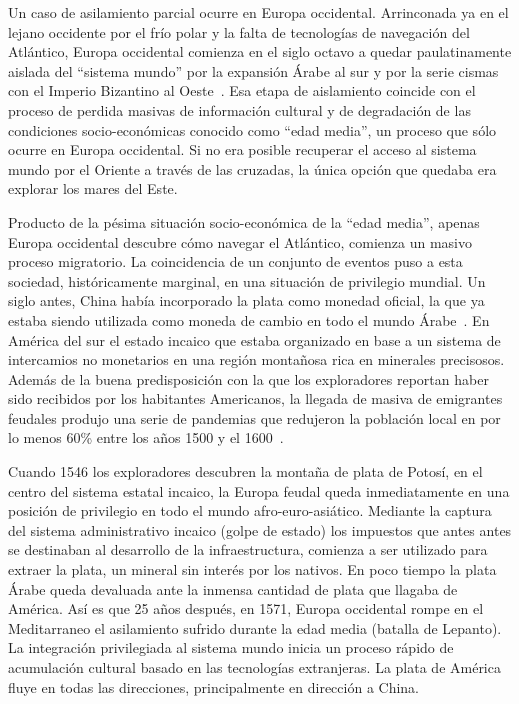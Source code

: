 \documentclass[a4paper,10pt]{book}
\theoremstyle{definition}
\begin{document}
Un caso de asilamiento parcial ocurre en Europa occidental.
Arrinconada ya en el lejano occidente por el fr\'io polar y la falta de tecnolog\'ias de navegaci\'on del Atlántico, Europa occidental comienza en el siglo octavo a quedar paulatinamente aislada del ``sistema mundo'' por la expansión Árabe al sur y por la serie cismas con el Imperio Bizantino al Oeste~\cite{Dussel}.
Esa etapa de aislamiento coincide con el proceso de perdida masivas de información cultural y de degradación de las condiciones socio-económicas conocido como ``edad media'', un proceso que sólo ocurre en Europa occidental.
Si no era posible recuperar el acceso al sistema mundo por el Oriente a través de las cruzadas, la única opci\'on que quedaba era explorar los mares del Este.


Producto de la pésima situación socio-económica de la ``edad media'', apenas Europa occidental descubre cómo navegar el Atlántico, comienza un masivo proceso migratorio.
La coincidencia de un conjunto de eventos puso a esta sociedad, históricamente marginal, en una situación de privilegio mundial.
Un siglo antes, China hab\'ia incorporado la plata como monedad oficial, la que ya estaba siendo utilizada como moneda de cambio en todo el mundo Árabe~\cite{pomeranz2000-divergence, pomeranz2018-tradeCreated}.
En América del sur el estado incaico que estaba organizado en base a un sistema de intercamios no monetarios en una región montañosa rica en minerales precisosos.
Además de la buena predisposición con la que los exploradores reportan haber sido recibidos por los habitantes Americanos, la llegada de masiva de emigrantes feudales produjo una serie de pandemias que redujeron la población local en por lo menos 60\% entre los años 1500 y el 1600~\cite{koch2019-europeanArrival}.


Cuando 1546 los exploradores descubren la montaña de plata de Potosí, en el centro del sistema estatal incaico, la Europa feudal queda inmediatamente en una posición de privilegio en todo el mundo afro-euro-asiático.
Mediante la captura del sistema administrativo incaico (golpe de estado) los impuestos que antes antes se destinaban al desarrollo de la infraestructura, comienza a ser utilizado para extraer la plata, un mineral sin interés por los nativos.
En poco tiempo la plata Árabe queda devaluada ante la inmensa cantidad de plata que llagaba de América.
Así es que 25 años después, en 1571, Europa occidental rompe en el Meditarraneo el asilamiento sufrido durante la edad media (batalla de Lepanto).
La integración privilegiada al sistema mundo inicia un proceso rápido de acumulación cultural basado en las tecnologías extranjeras.
La plata de América fluye en todas las direcciones, principalmente en dirección a China.
\end{document}
